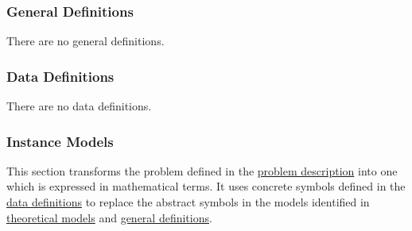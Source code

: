 \documentclass[12pt]{article}
\begin{document}
\subsubsection{General Definitions}
\label{Sec:GDs}
There are no general definitions.

\subsubsection{Data Definitions}
\label{Sec:DDs}
There are no data definitions.

\subsubsection{Instance Models}
\label{Sec:IMs}
This section transforms the problem defined in the \hyperref[Sec:ProbDesc]{problem description} into one which is expressed in mathematical terms. It uses concrete symbols defined in the \hyperref[Sec:DDs]{data definitions} to replace the abstract symbols in the models identified in \hyperref[Sec:TMs]{theoretical models} and \hyperref[Sec:GDs]{general definitions}.
\end{document}
